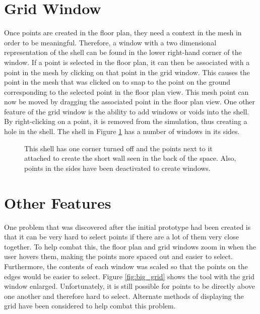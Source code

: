 \documentclass{thesis}
\begin{document}
\section{Grid Window}
Once points are created in the floor plan, they need a context in the mesh in order to be meaningful.  Therefore, a window with
a two dimensional representation of the shell can be found in the lower right-hand corner of the window.  If a point is selected
in the floor plan, it can then be associated with a point in the mesh by clicking on that point in the grid window.  This causes
the point in the mesh that was clicked on to snap to the point on the ground corresponding to the selected point in the
floor plan view.  This mesh point can now be moved by dragging the associated point in the floor plan view.  One other
feature of the grid window is the ability to add windows or voids into the shell.  By right-clicking on a point, it is
removed from the simulation, thus creating a hole in the shell.  The shell in Figure \ref{fig:bird_windows} has a number
of windows in its sides.

\begin{figure}
\caption[Shell with windows]{This shell has one corner turned off and the points next to it attached to create the short wall
seen in the back of the space.  Also, points in the sides have been deactivated to create windows.}
\label{fig:bird_windows}
\end{figure}

\section{Other Features}
One problem that was discovered after the initial prototype had been created is that it can be very hard to select points if
there are a lot of them very close together.  To help combat this, the floor plan and grid windows zoom in when the user hovers
them, making the points more spaced out and easier to select.  Furthermore, the contents of each window was scaled so that the
points on the edges would be easier to select.  Figure \ref{fig:big_grid} shows the tool with the grid window enlarged.
Unfortunately, it is still possible for points to be directly above one another and therefore hard to select.  Alternate methods
of displaying the grid have been considered to help combat this problem.
\end{document}
